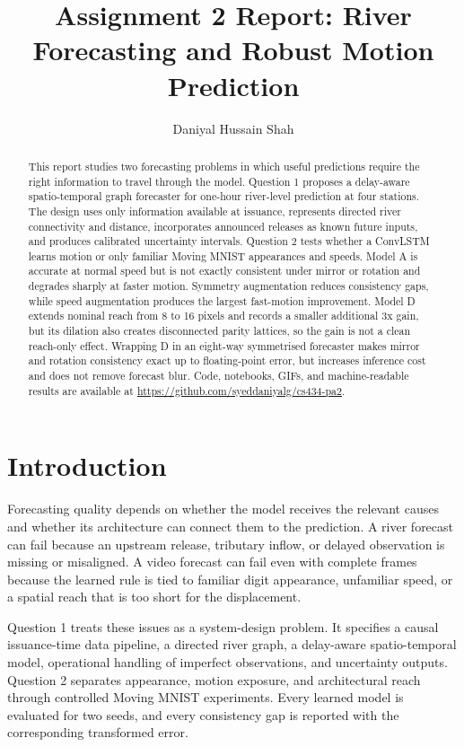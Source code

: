 \documentclass{article}
\title{Assignment 2 Report: River Forecasting and Robust Motion Prediction}
\author{
  Daniyal Hussain Shah
}
\begin{document}
\maketitle

\begin{abstract}
This report studies two forecasting problems in which useful predictions require the right information to travel through the model. Question 1 proposes a delay-aware spatio-temporal graph forecaster for one-hour river-level prediction at four stations. The design uses only information available at issuance, represents directed river connectivity and distance, incorporates announced releases as known future inputs, and produces calibrated uncertainty intervals. Question 2 tests whether a ConvLSTM learns motion or only familiar Moving MNIST appearances and speeds. Model A is accurate at normal speed but is not exactly consistent under mirror or rotation and degrades sharply at faster motion. Symmetry augmentation reduces consistency gaps, while speed augmentation produces the largest fast-motion improvement. Model D extends nominal reach from 8 to 16 pixels and records a smaller additional 3x gain, but its dilation also creates disconnected parity lattices, so the gain is not a clean reach-only effect. Wrapping D in an eight-way symmetrised forecaster makes mirror and rotation consistency exact up to floating-point error, but increases inference cost and does not remove forecast blur. Code, notebooks, GIFs, and machine-readable results are available at \url{https://github.com/syeddaniyalg/cs434-pa2}.
\end{abstract}

\section{Introduction}

Forecasting quality depends on whether the model receives the relevant causes and whether its architecture can connect them to the prediction. A river forecast can fail because an upstream release, tributary inflow, or delayed observation is missing or misaligned. A video forecast can fail even with complete frames because the learned rule is tied to familiar digit appearance, unfamiliar speed, or a spatial reach that is too short for the displacement.

Question 1 treats these issues as a system-design problem. It specifies a causal issuance-time data pipeline, a directed river graph, a delay-aware spatio-temporal model, operational handling of imperfect observations, and uncertainty outputs. Question 2 separates appearance, motion exposure, and architectural reach through controlled Moving MNIST experiments. Every learned model is evaluated for two seeds, and every consistency gap is reported with the corresponding transformed error.
\end{document}
